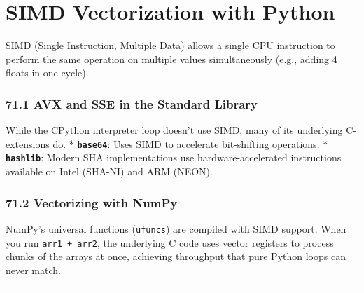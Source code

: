 \hypertarget{simd-vectorization-with-python}{%
\chapter{SIMD Vectorization with
Python}\label{simd-vectorization-with-python}}

SIMD (Single Instruction, Multiple Data) allows a single CPU instruction
to perform the same operation on multiple values simultaneously (e.g.,
adding 4 floats in one cycle).

\hypertarget{avx-and-sse-in-the-standard-library}{%
\subsection{71.1 AVX and SSE in the Standard
Library}\label{avx-and-sse-in-the-standard-library}}

While the CPython interpreter loop doesn't use SIMD, many of its
underlying C-extensions do. * \textbf{\passthrough{\lstinline!base64!}}:
Uses SIMD to accelerate bit-shifting operations. *
\textbf{\passthrough{\lstinline!hashlib!}}: Modern SHA implementations
use hardware-accelerated instructions available on Intel (SHA-NI) and
ARM (NEON).

\hypertarget{vectorizing-with-numpy}{%
\subsection{71.2 Vectorizing with NumPy}\label{vectorizing-with-numpy}}

NumPy's universal functions (\passthrough{\lstinline!ufuncs!}) are
compiled with SIMD support. When you run
\passthrough{\lstinline!arr1 + arr2!}, the underlying C code uses vector
registers to process chunks of the arrays at once, achieving throughput
that pure Python loops can never match.

\begin{center}\rule{0.5\linewidth}{0.5pt}\end{center}
